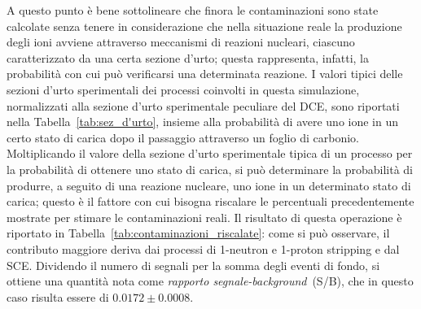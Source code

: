 A questo punto è bene sottolineare che finora le contaminazioni sono state calcolate senza tenere in considerazione che nella situazione reale la produzione degli ioni avviene attraverso meccanismi di reazioni nucleari, ciascuno caratterizzato da una certa sezione d'urto; questa rappresenta, infatti, la probabilità con cui può verificarsi una determinata reazione.
I valori tipici delle sezioni d'urto sperimentali dei processi coinvolti in questa simulazione, normalizzati alla sezione d'urto sperimentale peculiare del DCE, sono riportati nella Tabella~\ref{tab:sez_d'urto}, insieme alla probabilità di avere uno ione in un certo stato di carica dopo il passaggio attraverso un foglio di carbonio.
Moltiplicando il valore della sezione d'urto sperimentale tipica di un processo per la probabilità di ottenere uno stato di carica, si può determinare la probabilità di produrre, a seguito di una reazione nucleare, uno ione in un determinato stato di carica;
questo è il fattore con cui bisogna riscalare le percentuali precedentemente mostrate per stimare le contaminazioni reali.
Il risultato di questa operazione è riportato in Tabella~\ref{tab:contaminazioni_riscalate}: come si può osservare, il contributo maggiore deriva dai processi di 1-neutron e 1-proton stripping e dal SCE.
Dividendo il numero di segnali per la somma degli eventi di fondo, si ottiene una quantità nota come \emph{rapporto segnale-background}~(S/B), che in questo caso risulta essere di $0.0172 \pm 0.0008$.




